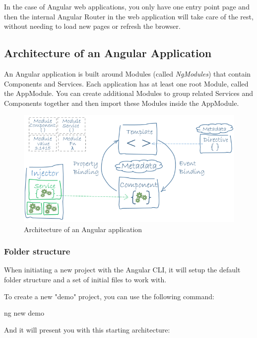 \documentclass[11pt,a4paper]{report}
\newenvironment{code}{\captionsetup{type=listing}}{}
\begin{document}
In the case of Angular web applications, you only have one entry point page and then the internal Angular Router in the web application will take care of the rest, without needing to load new pages or refresh the browser.
\subsection{Architecture of an Angular Application}
An Angular application is built around Modules (called \emph{NgModules})\cite{angular:doc:modules} that contain Components and Services. Each application has at least one root Module, called the AppModule. You can create additional Modules to group related Services and Components together and then import these Modules inside the AppModule.
\begin{figure}[H]
\begin{center}
	\includegraphics[width=.8\textwidth]{assets/angular_architecture}
	\caption[Architecture of an Angular application]{Architecture of an Angular application\cite{angular:ref:architecture}}
\end{center}
\end{figure}
\subsubsection{Folder structure}
When initiating a new project with the Angular CLI, it will setup the default folder structure and a set of initial files to work with.

To create a new "demo" project, you can use the following command:
\begin{code}
	\begin{shell}
ng new demo
	\end{shell}
	\caption{Command to create a new Angular project}
\end{code}
And it will present you with this starting architecture:
\end{document}
